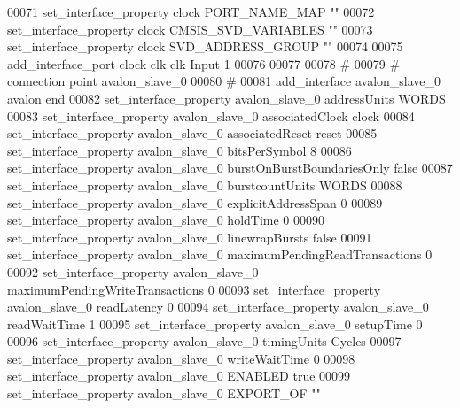 \begin{DoxyCode}
00071 \textcolor{comment}{}set\_interface\_property clock PORT\_NAME\_MAP ""\textcolor{comment}{}
00072 \textcolor{comment}{}set\_interface\_property clock CMSIS\_SVD\_VARIABLES ""\textcolor{comment}{}
00073 \textcolor{comment}{}set\_interface\_property clock SVD\_ADDRESS\_GROUP ""\textcolor{comment}{}
00074 \textcolor{comment}{}
00075 add\_interface\_port clock clk clk Input 1\textcolor{comment}{}
00076 \textcolor{comment}{}
00077 
00078 \textcolor{comment}{# }
00079 \textcolor{comment}{}\textcolor{comment}{# connection point avalon\_slave\_0}
00080 \textcolor{comment}{}\textcolor{comment}{# }
00081 \textcolor{comment}{}add\_interface avalon\_slave\_0 avalon end\textcolor{comment}{}
00082 \textcolor{comment}{}set\_interface\_property avalon\_slave\_0 addressUnits WORDS\textcolor{comment}{}
00083 \textcolor{comment}{}set\_interface\_property avalon\_slave\_0 associatedClock clock\textcolor{comment}{}
00084 \textcolor{comment}{}set\_interface\_property avalon\_slave\_0 associatedReset reset\textcolor{comment}{}
00085 \textcolor{comment}{}set\_interface\_property avalon\_slave\_0 bitsPerSymbol 8\textcolor{comment}{}
00086 \textcolor{comment}{}set\_interface\_property avalon\_slave\_0 burstOnBurstBoundariesOnly false\textcolor{comment}{}
00087 \textcolor{comment}{}set\_interface\_property avalon\_slave\_0 burstcountUnits WORDS\textcolor{comment}{}
00088 \textcolor{comment}{}set\_interface\_property avalon\_slave\_0 explicitAddressSpan 0\textcolor{comment}{}
00089 \textcolor{comment}{}set\_interface\_property avalon\_slave\_0 holdTime 0\textcolor{comment}{}
00090 \textcolor{comment}{}set\_interface\_property avalon\_slave\_0 linewrapBursts false\textcolor{comment}{}
00091 \textcolor{comment}{}set\_interface\_property avalon\_slave\_0 maximumPendingReadTransactions 0\textcolor{comment}{}
00092 \textcolor{comment}{}set\_interface\_property avalon\_slave\_0 maximumPendingWriteTransactions 0\textcolor{comment}{}
00093 \textcolor{comment}{}set\_interface\_property avalon\_slave\_0 readLatency 0\textcolor{comment}{}
00094 \textcolor{comment}{}set\_interface\_property avalon\_slave\_0 readWaitTime 1\textcolor{comment}{}
00095 \textcolor{comment}{}set\_interface\_property avalon\_slave\_0 setupTime 0\textcolor{comment}{}
00096 \textcolor{comment}{}set\_interface\_property avalon\_slave\_0 timingUnits Cycles\textcolor{comment}{}
00097 \textcolor{comment}{}set\_interface\_property avalon\_slave\_0 writeWaitTime 0\textcolor{comment}{}
00098 \textcolor{comment}{}set\_interface\_property avalon\_slave\_0 ENABLED true\textcolor{comment}{}
00099 \textcolor{comment}{}set\_interface\_property avalon\_slave\_0 EXPORT\_OF ""\textcolor{comment}{}

\end{DoxyCode}
